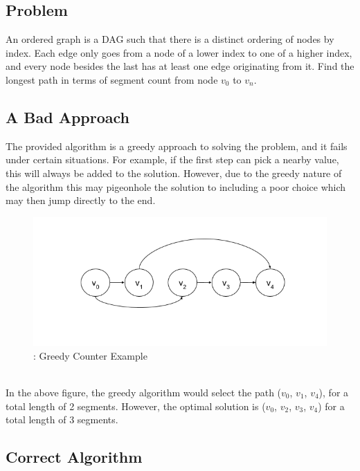\documentclass[titlepage]{article}
\numberwithin{equation}{subsection}
\begin{document}
\subsection{Problem}
An ordered graph is a DAG such that there is a distinct ordering of nodes by index. Each edge only goes
from a node of a lower index to one of a higher index, and every node besides the last has at least one
edge originating from it. Find the longest path in terms of segment count from node $v_0$ to $v_n$.
\subsection{A Bad Approach}
The provided algorithm is a greedy approach to solving the problem, and it fails under certain situations.
For example, if the first step can pick a nearby value, this will always be added to the solution. However,
due to the greedy nature of the algorithm this may pigeonhole the solution to including a poor choice which
may then jump directly to the end. 
\begin{figure}
    \includegraphics[width=\linewidth]{counter2.png}
    \figurename{: Greedy Counter Example}
\end{figure}
\\
In the above figure, the greedy algorithm would select the path ($v_0$, $v_1$, $v_4$), for a total length of
2 segments. However, the optimal solution is ($v_0$, $v_2$, $v_3$, $v_4$) for a total length of 3 segments.
\subsection{Correct Algorithm}
\end{document}
